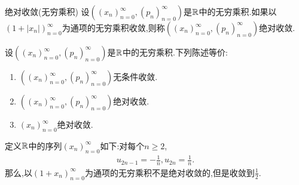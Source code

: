\begin{definition}{绝对收敛(无穷乘积)}{}
	设$\left(\left(x_{n}\right)_{n=0}^{\infty},\left(p_{n}\right)_{n=0}^{\infty}\right)$是$\mathbb{R}$中的无穷乘积.如果以$\left(1+\left|x_{n}\right|\right)_{n=0}^{\infty}$为通项的无穷乘积收敛,则称$\left(\left(x_{n}\right)_{n=0}^{\infty},\left(p_{n}\right)_{n=0}^{\infty}\right)$绝对收敛.
\end{definition}

\begin{proposition}{}{}
	设$\left(\left(x_{n}\right)_{n=0}^{\infty},\left(p_{n}\right)_{n=0}^{\infty}\right)$是$\mathbb{R}$中的无穷乘积.下列陈述等价:
	\begin{enumerate}
		\item $\left(\left(x_{n}\right)_{n=0}^{\infty},\left(p_{n}\right)_{n=0}^{\infty}\right)$无条件收敛.
		\item $\left(\left(x_{n}\right)_{n=0}^{\infty},\left(p_{n}\right)_{n=0}^{\infty}\right)$绝对收敛.
		\item $\left(x_{n}\right)_{n=0}^{\infty}$绝对收敛.
	\end{enumerate}
\end{proposition}

\begin{example}{}{}
	定义$\mathbb{R}$中的序列$\left(x_{n}\right)_{n=0}^{\infty}$如下:对每个$n\geq 2$,
	\begin{align*}
		u_{2n-1}=-\frac{1}{n},u_{2n}=\frac{1}{n}.
	\end{align*}
	那么,以$\left(1+x_{n}\right)_{n=0}^{\infty}$为通项的无穷乘积不是绝对收敛的,但是收敛到$\frac{1}{2}$.
\end{example}